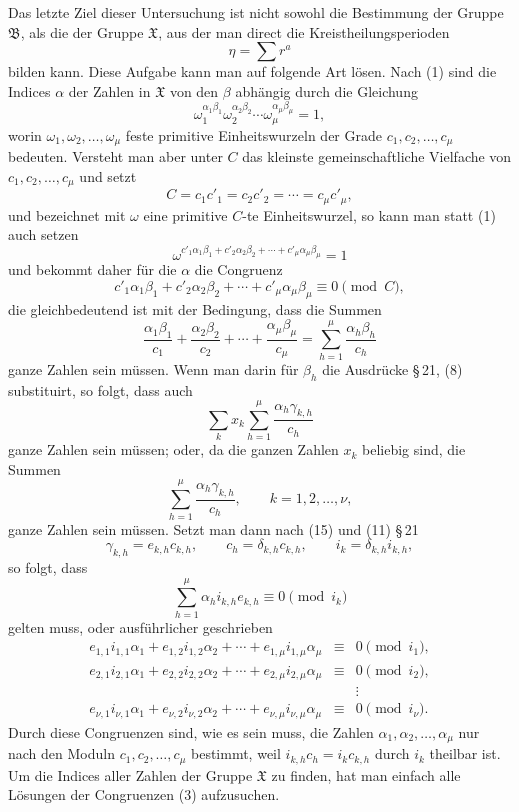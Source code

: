 \documentclass[11pt]{article}
\providecommand{\grpB}{\mathfrak B}
\providecommand{\grpX}{\mathfrak X}
\begin{document}
Das letzte Ziel dieser Untersuchung ist nicht sowohl die Bestimmung der Gruppe $\grpB$, als die der Gruppe $\grpX$, aus der man direct die Kreistheilungsperioden
\[
   \eta=\sum r^a
\]
bilden kann. Diese Aufgabe kann man auf folgende Art lösen. Nach (1) sind die Indices $\alpha$ der Zahlen in $\grpX$ von den $\beta$ abhängig durch die Gleichung
\begin{equation}
  \omega_1^{\alpha_1\beta_1}\omega_2^{\alpha_2\beta_2}\cdots
  \omega_\mu^{\alpha_\mu\beta_\mu}=1,
  \tag{1}
\end{equation}
worin $\omega_1,\omega_2,\ldots,\omega_\mu$ feste primitive Einheitswurzeln der Grade $c_1,c_2,\ldots,c_\mu$ bedeuten. Versteht man aber unter $C$ das kleinste gemeinschaftliche Vielfache von $c_1,c_2,\ldots,c_\mu$ und setzt
\begin{equation}
  C=c_1c'_1=c_2c'_2=\cdots=c_\mu c'_\mu,
  \tag{2}
\end{equation}
und bezeichnet mit $\omega$ eine primitive $C$-te Einheitswurzel, so kann man statt (1) auch setzen
\[
   \omega^{c'_1\alpha_1\beta_1+c'_2\alpha_2\beta_2+
   \cdots+c'_\mu\alpha_\mu\beta_\mu}=1
\]
und bekommt daher für die $\alpha$ die Congruenz
\[
   c'_1\alpha_1\beta_1+c'_2\alpha_2\beta_2+
   \cdots+c'_\mu\alpha_\mu\beta_\mu\equiv0\pmod C,
\]
die gleichbedeutend ist mit der Bedingung, dass die Summen
\[
   \frac{\alpha_1\beta_1}{c_1}+\frac{\alpha_2\beta_2}{c_2}+
   \cdots+\frac{\alpha_\mu\beta_\mu}{c_\mu}
   =\sum_{h=1}^{\mu}\frac{\alpha_h\beta_h}{c_h}
\]
ganze Zahlen sein müssen. Wenn man darin für $\beta_h$ die Ausdrücke \S\,21, (8) substituirt, so folgt, dass auch
\[
   \sum_k x_k\sum_{h=1}^{\mu}\frac{\alpha_h\gamma_{k,h}}{c_h}
\]
ganze Zahlen sein müssen; oder, da die ganzen Zahlen $x_k$ beliebig sind, die Summen
\[
   \sum_{h=1}^{\mu}\frac{\alpha_h\gamma_{k,h}}{c_h},
   \qquad k=1,2,\ldots,\nu,
\]
ganze Zahlen sein müssen. Setzt man dann nach (15) und (11) \S\,21
\[
   \gamma_{k,h}=e_{k,h}c_{k,h},
   \qquad c_h=\delta_{k,h}c_{k,h},
   \qquad i_k=\delta_{k,h}i_{k,h},
\]
so folgt, dass
\[
   \sum_{h=1}^{\mu}\alpha_h i_{k,h}e_{k,h}\equiv0\pmod {i_k}
\]
gelten muss, oder ausführlicher geschrieben
\begin{equation}
\begin{array}{rcl}
 e_{1,1}i_{1,1}\alpha_1+e_{1,2}i_{1,2}\alpha_2+
     \cdots+e_{1,\mu}i_{1,\mu}\alpha_\mu&\equiv&0\pmod {i_1},\\
 e_{2,1}i_{2,1}\alpha_1+e_{2,2}i_{2,2}\alpha_2+
     \cdots+e_{2,\mu}i_{2,\mu}\alpha_\mu&\equiv&0\pmod {i_2},\\
 &&\vdots\\
 e_{\nu,1}i_{\nu,1}\alpha_1+e_{\nu,2}i_{\nu,2}\alpha_2+
     \cdots+e_{\nu,\mu}i_{\nu,\mu}\alpha_\mu&\equiv&0\pmod {i_\nu}.
\end{array}
\tag{3}
\end{equation}
Durch diese Congruenzen sind, wie es sein muss, die Zahlen $\alpha_1,\alpha_2,\ldots,\alpha_\mu$ nur nach den Moduln $c_1,c_2,\ldots,c_\mu$ bestimmt, weil $i_{k,h}c_h=i_kc_{k,h}$ durch $i_k$ theilbar ist. Um die Indices aller Zahlen der Gruppe $\grpX$ zu finden, hat man einfach alle Lösungen der Congruenzen (3) aufzusuchen.
\end{document}
